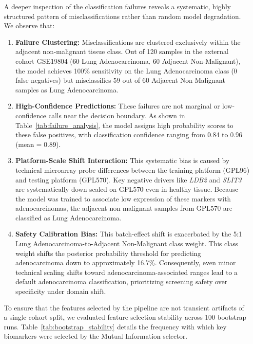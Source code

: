 \documentclass[journal,10pt]{IEEEtran}
\begin{document}
A deeper inspection of the classification failures reveals a systematic, highly structured pattern of misclassifications rather than random model degradation. We observe that:
\begin{enumerate}
    \item \textbf{Failure Clustering:} Misclassifications are clustered exclusively within the adjacent non-malignant tissue class. Out of 120 samples in the external cohort GSE19804 (60 Lung Adenocarcinoma, 60 Adjacent Non-Malignant), the model achieves 100\% sensitivity on the Lung Adenocarcinoma class (0 false negatives) but misclassifies 59 out of 60 Adjacent Non-Malignant samples as Lung Adenocarcinoma.
    \item \textbf{High-Confidence Predictions:} These failures are not marginal or low-confidence calls near the decision boundary. As shown in Table~\ref{tab:failure_analysis}, the model assigns high probability scores to these false positives, with classification confidence ranging from 0.84 to 0.96 (mean = 0.89).
    \item \textbf{Platform-Scale Shift Interaction:} This systematic bias is caused by technical microarray probe differences between the training platform (GPL96) and testing platform (GPL570). Key negative drivers like \textit{LDB2} and \textit{SLIT3} are systematically down-scaled on GPL570 even in healthy tissue. Because the model was trained to associate low expression of these markers with adenocarcinomas, the adjacent non-malignant samples from GPL570 are classified as Lung Adenocarcinoma.
    \item \textbf{Safety Calibration Bias:} This batch-effect shift is exacerbated by the 5:1 Lung Adenocarcinoma-to-Adjacent Non-Malignant class weight. This class weight shifts the posterior probability threshold for predicting adenocarcinoma down to approximately 16.7\%. Consequently, even minor technical scaling shifts toward adenocarcinoma-associated ranges lead to a default adenocarcinoma classification, prioritizing screening safety over specificity under domain shift.
\end{enumerate}

To ensure that the features selected by the pipeline are not transient artifacts of a single cohort split, we evaluated feature selection stability across 100 bootstrap runs. Table~\ref{tab:bootstrap_stability} details the frequency with which key biomarkers were selected by the Mutual Information selector.
\end{document}
